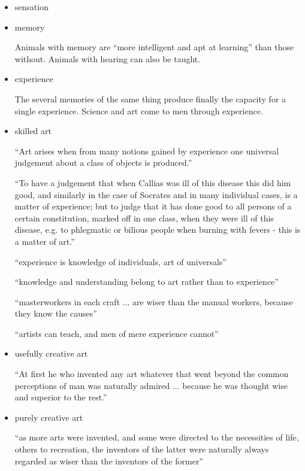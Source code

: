 \documentclass[10pt,titlepage]{article}
\begin{document}
\begin{itemize}
\item sensation

\item memory

Animals with memory are ``more intelligent and apt at learning'' than those without.
Animals with hearing can also be taught.

\item experience

The several memories of the same thing produce finally the capacity for a single experience.
Science and art come to men through experience.

\item skilled art

``Art arises when from many notions gained by experience one universal judgement about a class of objects is produced.''

``To have a judgement that when Callias was ill of this
disease this did him good, and similarly in the case of Socrates and in many
individual cases, is a matter of experience; but to judge that it has done good
to all persons of a certain constitution, marked off in one class, when they
were ill of this disease, e.g. to phlegmatic or bilious people when burning
with fevers - this is a matter of art.''

``experience is knowledge of individuals, art of universals''

``knowledge and understanding belong to art rather than to experience''

``masterworkers in each craft ... are wiser than the manual workers, because they know the causes''

``artists can teach, and men of mere experience cannot''

\item usefully creative art

``At first he who invented any art whatever that went beyond the common
perceptions of man was naturally admired ... because he was thought wise
and superior to the rest.''

\item purely creative art

``as more arts were invented, and some were directed to the necessities of life, others to recreation, the inventors of the
latter were naturally always regarded as wiser than the inventors of the former''

\end{itemize}
\end{document}
